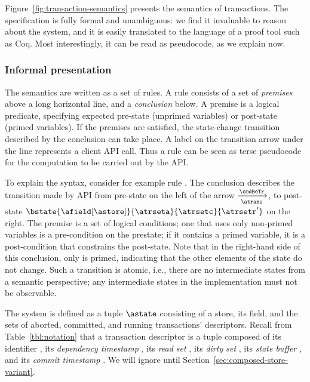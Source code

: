 Figure~\ref{fig:transaction-semantics} presents the semantics of
transactions.
The specification is fully formal and unambiguous: we find it invaluable
to reason about the system, and it is easily translated to the language
of a proof tool such as Coq.
Most interestingly, it can be read as pseudocode, as we explain now.

\subsubsection{Informal presentation}

The semantics are written as a set of rules.
A rule consists of a set of \emph{premises} above a long horizontal
line, and a \emph{conclusion} below.
A premise is a logical predicate, specifying expected pre-state
(unprimed variables) or post-state (primed variables).
If the premises are satisfied, the state-change transition described by
the conclusion can take place.
A label on the transition arrow under the line represents a client API
call.
Thus a rule can be seen as terse pseudocode for the computation to be
carried out by the API.

To explain the syntax, consider for example rule \starttxnrule{}.
The conclusion describes the transition made by API \cmdBeTr[\asnpsht]
from pre-state \astate{} on the left
of the arrow $\xrightarrow[\atrans]{\cmdBeTr}$, to post-state
$\bstate{\afield[\astore]}{\atrseta}{\atrsetc}{\atrsetr'}$ on the right.
The premise is a set of logical conditions; one that uses only
non-primed variables is a pre-condition on the prestate; if it contains
a primed variable, it is a post-condition that constrains the
post-state.
Note that in the right-hand side of this conclusion, only \atrsetr{} is
primed, indicating that the other elements of the state do not change.
Such a transition is atomic, i.e., there are no intermediate states from
a semantic perspective; any intermediate states in the implementation
must not be observable.

The system is defined as a tuple $\astate$ consisting of a store, its
field, and the sets of aborted, committed, and running transactions'
descriptors.
Recall from Table~\ref{tbl:notation} that a transaction descriptor is a
tuple composed of its identifier \atrans, its \emph{dependency
  timestamp} \asnpsht, its \emph{read set} \areadset, its \emph{dirty set}
\adirtyset, its \emph{state buffer} \astatebuf, and its \emph{commit
  timestamp} \acomstp.
We will ignore \afield[\astore{}]{} until
Section~\ref{sec:composed-store-variant}.

